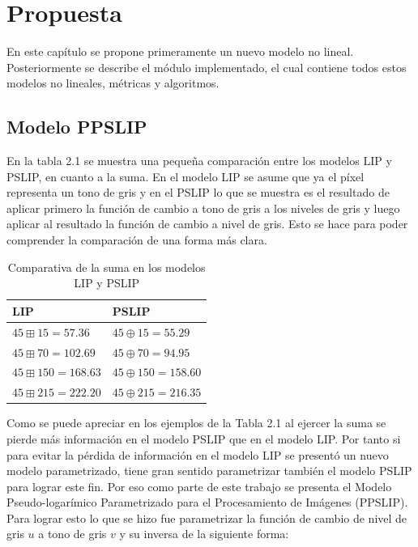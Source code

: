 \chapter{Propuesta}\label{chapter:proposal}

En este cap\'itulo se propone primeramente un nuevo modelo no lineal. Posteriormente se describe el m\'odulo implementado, el cual contiene todos estos modelos no lineales, m\'etricas y algoritmos.

\section{Modelo PPSLIP}

En la tabla 2.1 se muestra una peque\~na comparaci\'on entre los modelos LIP y PSLIP, en cuanto a la suma. En el modelo LIP se asume que ya el p\'ixel representa un tono de gris y en el PSLIP lo que se muestra es el resultado de aplicar primero la funci\'on de cambio a tono de gris a los niveles de gris y luego aplicar al resultado la funci\'on de cambio a nivel de gris. Esto se hace para poder comprender la comparaci\'on de una forma m\'as clara.

\begin{table}
	\caption{Comparativa de la suma en los modelos LIP y PSLIP}
	\begin{center}
		\begin{tabular}{|l|l|}
			\hline 
			\textbf{LIP} & \textbf{PSLIP}\\
			\hline
			$45 \boxplus 15 = 57.36$ & $45 \oplus 15 = 55.29$\\
			\hline
			$45 \boxplus 70 = 102.69$ & $45 \oplus 70 = 94.95$\\
			\hline
			$45 \boxplus 150 = 168.63$ & $45 \oplus 150 = 158.60$\\
			\hline
			$45 \boxplus 215 = 222.20$ & $45 \oplus 215 = 216.35$\\
			\hline
		\end{tabular}
	\end{center}
\end{table}

Como se puede apreciar en los ejemplos de la Tabla 2.1 al ejercer la suma se pierde m\'as informaci\'on en el modelo PSLIP que en el modelo LIP. Por tanto si para evitar la p\'erdida de informaci\'on en el modelo LIP se present\'o un nuevo modelo parametrizado, tiene gran sentido parametrizar tambi\'en el modelo PSLIP para lograr este fin. Por eso como parte de este trabajo se presenta el Modelo Pseudo-logar\'imico Parametrizado para el Procesamiento de Im\'agenes (PPSLIP). Para lograr esto lo que se hizo fue parametrizar la funci\'on de cambio de nivel de gris $u$ a tono de gris $v$ y su inversa de la siguiente forma:

